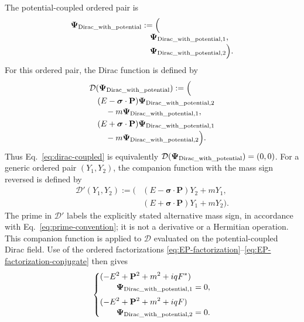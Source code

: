 \documentclass[10pt,letterpaper]{article}
\let\STAamsmathtext\text
\newcommand{\eqtext}[1]{\STAamsmathtext{\normalfont\rmfamily #1}}
\renewcommand{\text}[1]{\STAamsmathtext{\normalfont\rmfamily #1}}
\newcommand{\pv}[1]{#1}
\newcommand{\vct}[1]{\mathbf{#1}}
\newcommand{\sigv}{\vct{\pv{\bm{\sigma}}}}
\newcommand{\bPsi}{\pv{\bm{\Psi}}}
\newcommand{\conj}[1]{#1^{*}}
\begin{document}
The potential-coupled ordered pair is
\begin{equation*}
\begin{aligned}
\bPsi_{\eqtext{Dirac\_with\_potential}}
&:=\Bigl(\\[-0.4em]
&\quad\bPsi_{\eqtext{Dirac\_with\_potential},1},\\[-0.2em]
&\quad\bPsi_{\eqtext{Dirac\_with\_potential},2}
\Bigr).
\end{aligned}
\end{equation*}
For this ordered pair, the Dirac function is defined by
\begin{equation}
\begin{aligned}
&\mathcal{D}(\bPsi_{\eqtext{Dirac\_with\_potential}})
:=\Bigl(\\[-0.3em]
&\quad
(E-\sigv\cdot\vct{P})
\bPsi_{\eqtext{Dirac\_with\_potential},2}\\[-0.2em]
&\qquad
-m\bPsi_{\eqtext{Dirac\_with\_potential},1},\\
&\quad
(E+\sigv\cdot\vct{P})
\bPsi_{\eqtext{Dirac\_with\_potential},1}\\[-0.2em]
&\qquad
-m\bPsi_{\eqtext{Dirac\_with\_potential},2}
\Bigr).
\end{aligned}
\label{eq:dirac-potential-operator}
\end{equation}
Thus Eq.\ \eqref{eq:dirac-coupled} is equivalently
\(\mathcal{D}(\bPsi_{\eqtext{Dirac\_with\_potential}})
=(\pv{0},\pv{0})\). For a generic ordered pair
\((\pv{Y}_1,\pv{Y}_2)\), the companion function with the mass sign reversed
is defined by
\begin{equation}
\begin{aligned}
\mathcal{D}'(\pv{Y}_1,\pv{Y}_2)
:=\bigl(&
(E-\sigv\cdot\vct{P})\pv{Y}_2+m\pv{Y}_1,\\
&
(E+\sigv\cdot\vct{P})\pv{Y}_1+m\pv{Y}_2
\bigr).
\end{aligned}
\label{eq:dirac-mass-conjugate-operator}
\end{equation}
The prime in \(\mathcal{D}'\) labels the explicitly stated alternative mass
sign, in accordance with Eq.\ \eqref{eq:prime-convention}; it is not a
derivative or a Hermitian operation. This companion function is applied to
\(\mathcal D\) evaluated on the potential-coupled Dirac field. Use of the
ordered factorizations
\eqref{eq:EP-factorization}--\eqref{eq:EP-factorization-conjugate} then gives
\begin{equation}
\left\{
\begin{aligned}
&(-E^2+\vct{P}^2+m^2+iq\conj{\pv{F}})\\[-0.2em]
&\qquad\bPsi_{\eqtext{Dirac\_with\_potential},1}=0,\\[2pt]
&(-E^2+\vct{P}^2+m^2+iq\pv{F})\\[-0.2em]
&\qquad\bPsi_{\eqtext{Dirac\_with\_potential},2}=0.
\end{aligned}
\right.
\label{eq:dirac-square}
\end{equation}
\end{document}
